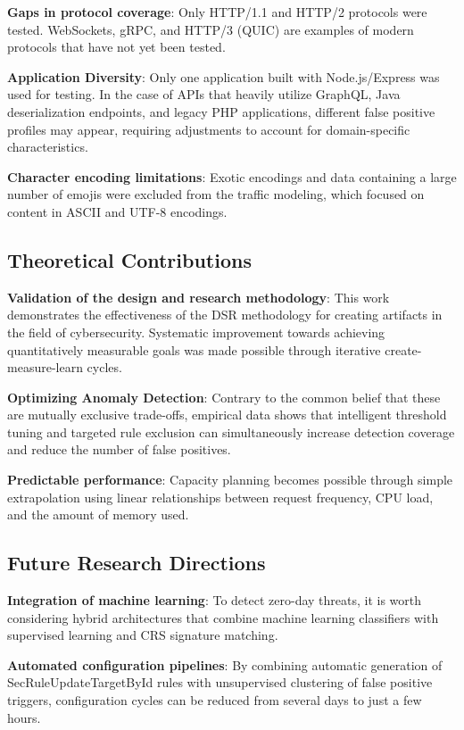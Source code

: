 \documentclass[10pt,conference]{IEEEtran}
\begin{document}
\textbf{Gaps in protocol coverage}: Only HTTP/1.1 and HTTP/2 protocols were tested. WebSockets, gRPC, and HTTP/3 (QUIC) are examples of modern protocols that have not yet been tested.

\textbf{Application Diversity}: Only one application built with Node.js/Express was used for testing. In the case of APIs that heavily utilize GraphQL, Java deserialization endpoints, and legacy PHP applications, different false positive profiles may appear, requiring adjustments to account for domain-specific characteristics.

\textbf{Character encoding limitations}: Exotic encodings and data containing a large number of emojis were excluded from the traffic modeling, which focused on content in ASCII and UTF-8 encodings.

\subsection{Theoretical Contributions}

\textbf{Validation of the design and research methodology}: This work demonstrates the effectiveness of the DSR methodology for creating artifacts in the field of cybersecurity. Systematic improvement towards achieving quantitatively measurable goals was made possible through iterative create-measure-learn cycles.

\textbf{Optimizing Anomaly Detection}: Contrary to the common belief that these are mutually exclusive trade-offs, empirical data shows that intelligent threshold tuning and targeted rule exclusion can simultaneously increase detection coverage and reduce the number of false positives.

\textbf{Predictable performance}: Capacity planning becomes possible through simple extrapolation using linear relationships between request frequency, CPU load, and the amount of memory used.

\subsection{Future Research Directions}

\textbf{Integration of machine learning}: To detect zero-day threats, it is worth considering hybrid architectures that combine machine learning classifiers with supervised learning and CRS signature matching.

\textbf{Automated configuration pipelines}: By combining automatic generation of SecRuleUpdateTargetById rules with unsupervised clustering of false positive triggers, configuration cycles can be reduced from several days to just a few hours.
\end{document}
